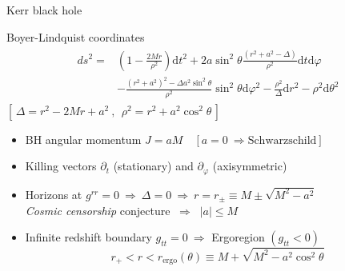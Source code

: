 \documentclass[9pt]{beamer}
\newcommand{\dd}{\mathrm{d}}
\begin{document}
\begin{frame}[fragile]{Kerr black hole}

    \vspace{0.15cm}

    \begin{block}{Boyer-Lindquist coordinates}
        \begin{align*}
            \begin{split}
                ds^2 = & \left(1 - \frac{2 M r}{\rho^2} \right) \dd t^2 + 2 a \sin^2\theta \frac{(r^2+a^2-\Delta)}{\rho^2} \dd t \dd \varphi \\
                &- \frac{(r^2+a^2)^2- \Delta a^2 \sin^2\theta}{\rho^2} \sin^2\theta \dd\varphi^2 - \frac{\rho^2}{\Delta} \dd r^2 - \rho^2 \dd \theta^2
            \end{split}
        \end{align*}
        \centering
        $\scriptstyle [\,\Delta=r^2 - 2 M r + a^2 ~,~~ \rho^2 = r^2 + a^2 \cos^2\theta\,]$
    \end{block}

    \begin{itemize}
        \setlength\itemsep{1em}
        \item BH angular momentum $J = a M \quad\left[ a=0 ~\Rightarrow \text{Schwarzschild} \right]$ 
        \item Killing vectors $\partial_t$ (stationary) and $\partial_\varphi$ (axisymmetric)
        \item Horizons at $g^{rr}=0 ~\Rightarrow~ \Delta=0 ~\Rightarrow~ r = r_{\pm} \equiv M \pm \sqrt{M^2-a^2}$ \\
        \emph{Cosmic censorship} conjecture $~\Rightarrow~$ $|a| \le M$
        
        \item Infinite redshift boundary $g_{tt}=0 ~\Rightarrow$ \alert{Ergoregion} $(g_{tt}<0)$
        $$r_+<r<r_\mathrm{ergo}(\theta) \equiv M + \sqrt{M^2 - a^2 \cos^2\theta}$$
    \end{itemize}
\end{frame}
\end{document}

